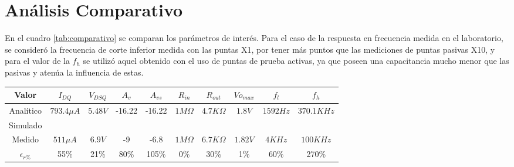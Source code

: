 \documentclass[a4paper, 10pt, spanish]{article}
\begin{document}
\section{Análisis Comparativo}
En el cuadro \ref{tab:comparativo} se comparan los parámetros de interés. Para el caso de la respuesta en frecuencia medida en el laboratorio, se consideró la frecuencia de corte inferior medida con las puntas X1, por tener más puntos que las mediciones de puntas pasivas X10, y para el valor de la $f_h$ se utilizó aquel obtenido con el uso de puntas de prueba activas, ya que poseen una capacitancia mucho menor que las pasivas y atenúa la influencia de estas.

\begin{center}
  \begin{tabular}{|c|c|c|c|c|c|c|c|c|c|}
    \hline
    Valor & $I_{DQ}$ & $V_{DSQ}$ & $A_v$ & $A_{vs}$ & $R_{in}$ & $R_{out}$ & $V{o_{max}}$ & $f_l$ & $f_h$ \\
    \hline
    Analítico & $793.4\mu A$& $5.48V$& -16.22 & -16.22 & $1M\Omega$ & $4.7K\Omega$ & $1.8V$ & $1592Hz$ & $370.1KHz$ \\
    \hline
    Simulado & & & & & & & & & \\
    \hline
    Medido & $511\mu A$ & $6.9V$ & -9 & -6.8 & $1M\Omega$ & $6.7K\Omega$ & $1.82V$ & $4KHz$ & $100KHz$ \\
    \hline
    \hline
    $\epsilon_{r\%}$ & 55\% & 21\% & 80\% & 105\% & 0\% & 30\% & 1\% & 60\% & 270\% \\
    \hline
  \end{tabular}
  \label{tab:comparativo}
\end{center}


\end{document}
